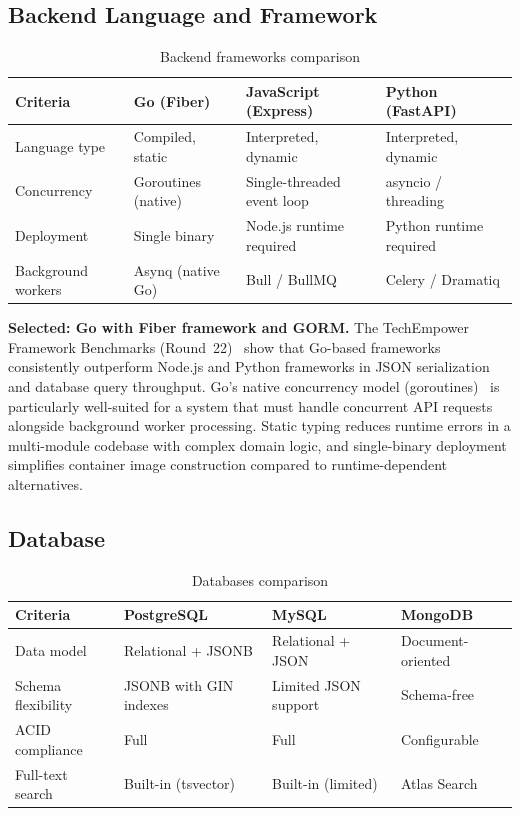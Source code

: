\documentclass[a4paper]{article}
\begin{document}
\subsection{Backend Language and Framework}

\begin{table}[H]
\centering
\caption{Backend frameworks comparison}
\label{tab:backend-comparison}
\begin{tabular}{l p{3.5cm} p{3.5cm} p{3.5cm}}
\hline
\textbf{Criteria} & \textbf{Go (Fiber)} & \textbf{JavaScript (Express)} & \textbf{Python (FastAPI)} \\
\hline
Language type & Compiled, static & Interpreted, dynamic & Interpreted, dynamic \\
Concurrency & Goroutines (native) & Single-threaded event loop & asyncio / threading \\
Deployment & Single binary & Node.js runtime required & Python runtime required \\
Background workers & Asynq (native Go) & Bull / BullMQ & Celery / Dramatiq \\
\hline
\end{tabular}
\end{table}

\textbf{Selected: Go with Fiber framework and GORM.}
The TechEmpower Framework Benchmarks (Round~22)~\cite{techempower2023}
show that Go-based frameworks consistently outperform Node.js and
Python frameworks in JSON serialization and database query
throughput. Go's native concurrency model
(goroutines)~\cite{pike2012go} is particularly well-suited for a
system that must handle concurrent API requests alongside
background worker processing. Static typing reduces runtime errors
in a multi-module codebase with complex domain logic, and
single-binary deployment simplifies container image construction
compared to runtime-dependent alternatives.

\subsection{Database}

\begin{table}[H]
\centering
\caption{Databases comparison}
\label{tab:database-comparison}
\begin{tabular}{l p{3.5cm} p{3.5cm} p{3.5cm}}
\hline
\textbf{Criteria} & \textbf{PostgreSQL} & \textbf{MySQL} & \textbf{MongoDB} \\
\hline
Data model & Relational + JSONB & Relational + JSON & Document-oriented \\
Schema flexibility & JSONB with GIN indexes & Limited JSON support & Schema-free \\
ACID compliance & Full & Full & Configurable \\
Full-text search & Built-in (tsvector) & Built-in (limited) & Atlas Search \\
\hline
\end{tabular}
\end{table}
\end{document}
